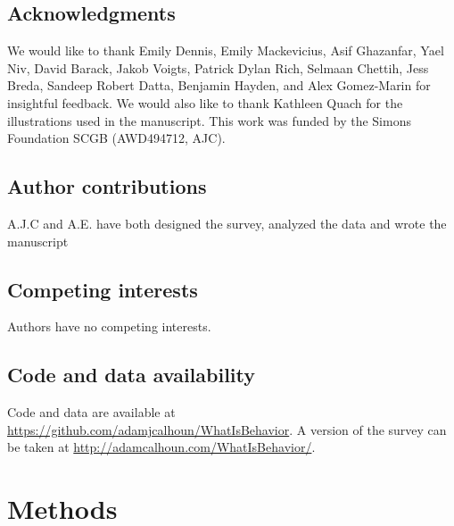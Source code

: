 \documentclass[a4paper, 11pt]{article}
\begin{document}
\subsection*{Acknowledgments}
We would like to thank Emily Dennis, Emily Mackevicius, Asif Ghazanfar, Yael Niv, David Barack, Jakob Voigts, Patrick Dylan Rich, Selmaan Chettih, Jess Breda, Sandeep Robert Datta, Benjamin Hayden, and Alex Gomez-Marin for insightful feedback. We would also like to thank Kathleen Quach for the illustrations used in the manuscript. This work was funded by the Simons Foundation SCGB (AWD494712, AJC).

\subsection*{Author contributions}
A.J.C and A.E. have both designed the survey, analyzed the data and wrote the manuscript

\subsection*{Competing interests}
Authors have no competing interests.

\subsection*{Code and data availability}
Code and data are available at \href{https://github.com/adamjcalhoun/WhatIsBehavior}{https://github.com/adamjcalhoun/WhatIsBehavior}. A version of the survey can be taken at \href{http://adamcalhoun.com/WhatIsBehavior/}{http://adamcalhoun.com/WhatIsBehavior/}.

\section*{Methods}
\end{document}
